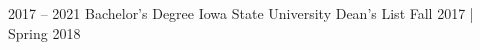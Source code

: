\documentclass[9pt]{developercv} %
\begin{document}
\vspace{0.5cm}

\begin{minipage}[t]{0.5\textwidth} %
	\vspace{-\baselineskip} %
	\begin{barchart}{5.5}


	\end{barchart}
\end{minipage}
\begin{minipage}[t]{0.5\textwidth} %
	\vspace{-\baselineskip} %
	\begin{barchart}{5.5}


	\end{barchart}
\end{minipage}





\begin{entrylist}
	\entry
		{2017 -- 2021}
		{Bachelor's Degree}
		{Iowa State University}
		{Dean's List Fall 2017 | Spring 2018}
\end{entrylist}


\end{document}

